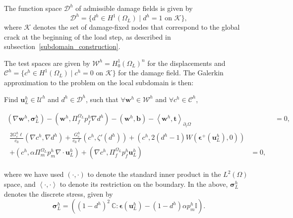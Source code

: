 The function space $\mathcal{D}^h$ of admissible damage fields is given by 
\begin{equation}\label{damage subspace}
    \mathcal{D}^h = \{ d^h \in H^1(\Omega_L) \mid d^h = 1 \text{ on } \mathcal{K} \},
\end{equation}
where $\mathcal{K}$ denotes the set of damage-fixed nodes that correspond to the global crack at the beginning of the load step, as described in subsection~\ref{subdomain_construction}. 

The test spaces are given by $\boldsymbol{\mathcal{W}}^h = H_0^1(\Omega_L)^n$ for the displacements and $\mathcal{C}^h = \{ c^h \in H^1(\Omega_L) \mid c^h = 0 \text{ on } \mathcal{K} \}$ for the damage field. The Galerkin approximation to the problem on the local subdomain is then:
\medskip

\begin{mdframed}[
    frametitle={The spatially discrete form},
    frametitlebackgroundcolor=gray!20,
    backgroundcolor=gray!5,
    linewidth=0pt,
    nobreak=true
  ]
  Find $\textbf{u}_L^h \in \boldsymbol{\mathcal{U}}^h$ and $d^h \in \mathcal{D}^h$, such that $\forall \textbf{w}^h \in \boldsymbol{\mathcal{W}}^h$ and $\forall c^h \in \mathcal{C}^h$,
 
 \begin{align}
  \left( \nabla \textbf{w}^h, \boldsymbol\sigma_L^h \right) - \left( \textbf{w}^h, \Pi^{\Omega_L}_f p_f^h \nabla d^h \right) - \left( \textbf{w}^h, \textbf{b} \right) - \left< \textbf{w}^h, \textbf{t} \right>_{\partial_t\Omega} &= 0, \label{eq: semidiscrete momentum balance ch3}   \\
  \begin{split}
    \frac{2G_c^h\ell}{c_0}\left( \nabla c^h, \nabla d^h \right) + \frac{G_c^h}{c_0\ell}\left( c^h, \zeta'(d^h) \right) + \left( c^h, 2(d^h-1)W(\boldsymbol{\epsilon^+}(\textbf{u}_L^h),0) \right) \\
    + \left( c^h, \alpha \Pi^{\Omega_L}_m p_m^h\nabla \cdot \textbf{u}_L^h \right) + \left( \nabla c^h, \Pi^{\Omega_L}_f p_f^h\textbf{u}_L^h \right)  &= 0, \label{eq: semidiscrete damage evolution}    
  \end{split} 
\end{align}

\end{mdframed}
where we have used $(\cdot,\cdot)$ to denote the standard inner product in the $L^2(\Omega)$ space, and $\left< \cdot, \cdot \right>$ to denote its restriction on the boundary.   In the above,  $\boldsymbol\sigma^h_L$ denotes the discrete stress, given by 
\begin{equation}
    \boldsymbol\sigma^h_L = \left( (1-d^h)^2\ \mathbb{C}:\boldsymbol\epsilon(\textbf{u}_L^h) -(1-d^h)\alpha p_m^h \mathbb{I}\right).
\end{equation}

